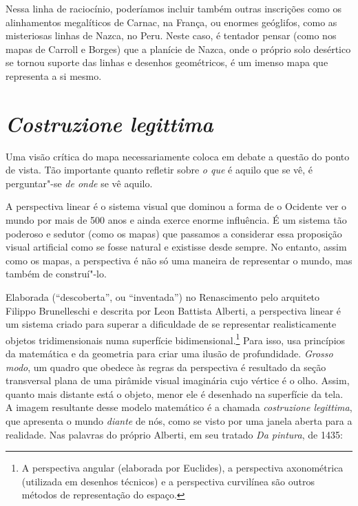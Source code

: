 Nessa linha de raciocínio, poderíamos incluir também outras inscrições
como os alinhamentos megalíticos de Carnac, na França, ou enormes
geóglifos, como as misteriosas linhas de Nazca, no Peru. Neste caso, é
tentador pensar (como nos mapas de Carroll e Borges) que a planície de
Nazca, onde o próprio solo desértico se tornou suporte das linhas e
desenhos geométricos, é um imenso mapa que representa a si mesmo.

\chapter{\emph{Costruzione legittima}}

Uma visão crítica do mapa necessariamente coloca em debate a questão do
ponto de vista. Tão importante quanto refletir sobre \emph{o que} é
aquilo que se vê, é perguntar"-se \emph{de onde} se vê aquilo.

A perspectiva linear é o sistema visual que dominou a forma de o
Ocidente ver o mundo por mais de 500 anos e ainda exerce enorme
influência. É um sistema tão poderoso e sedutor (como os mapas) que
passamos a considerar essa proposição visual artificial como se fosse
natural e existisse desde sempre. No entanto, assim como os mapas, a
perspectiva é não só uma maneira de representar o mundo, mas também de
construí"-lo.

Elaborada (``descoberta'', ou ``inventada'') no Renascimento pelo
arquiteto Filippo Brunelleschi e descrita por Leon Battista Alberti, a
perspectiva linear é um sistema criado para superar a dificuldade de se
representar realisticamente objetos tridimensionais numa superfície
bidimensional.\footnote{A perspectiva angular (elaborada por Euclides), a perspectiva axonométrica (utilizada em desenhos técnicos) e a perspectiva curvilínea são outros métodos de representação do espaço.} Para isso, usa princípios da matemática e da geometria
para criar uma ilusão de profundidade. \emph{Grosso modo}, um quadro que
obedece às regras da perspectiva é resultado da seção transversal plana
de uma pirâmide visual imaginária cujo vértice é o olho. Assim, quanto
mais distante está o objeto, menor ele é desenhado na superfície da
tela. A imagem resultante desse modelo matemático é a chamada
\emph{costruzione legittima}, que apresenta o mundo \emph{diante} de
nós, como se visto por uma janela aberta para a realidade. Nas palavras
do próprio Alberti, em seu tratado \emph{Da pintura}, de 1435:

